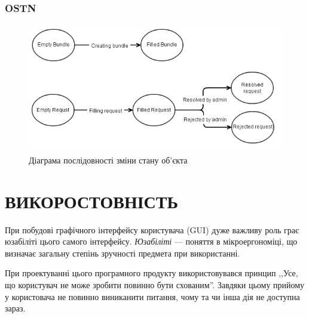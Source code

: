 \documentclass[a4paper,notitlepage,headsepline,pdftex,oneside]{report}
\newcommand{\setfontsize}[1]{\fontsize{#1pt}{#1pt}\selectfont}
\newcommand{\Chapter}[1]{\chapter{#1} \renewcommand{\baselinestretch}{1.5}\setfontsize{14pt}}
\newcommand{\Subsection}[1]{\subsection{#1} \renewcommand{\baselinestretch}{1.5}\setfontsize{14pt}}
\begin{document}
    \Subsection{OSTN}
      \begin{figure}[h]
        \centering
        \includegraphics[scale=0.6]{ostn.png}
        \caption{Діаграма послідовності зміни стану об’єкта}
        \label{fig:ostn}
      \end{figure}
      \clearpage
\Chapter{ВИКОРОСТОВНІСТЬ}
  При побудові графічного інтерфейсу користувача (GUI) дуже важливу роль грає
  юзабіліті цього самого інтерфейсу.
  \emph{Юзабіліті} ---  поняття в мікроергономіці, що визначає загальну
  степінь зручності предмета при використанні.

  При проектуванні цього програмного продукту використовувався принцип ,,Усе,
  що користувач не може зробити повинно бути схованим''.
  Завдяки цьому прийому у користовача не повинно виниканити питання, чому та
  чи інша дія не доступна зараз.
\end{document}
